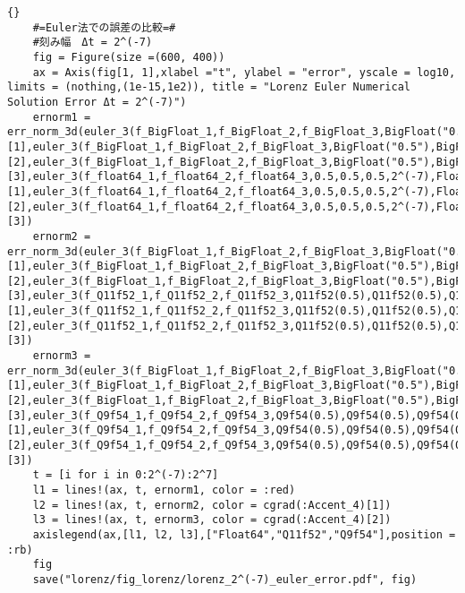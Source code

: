 \begin{lstlisting}[caption=\text{Lorenz\_example},label=code_lorenz]{}
    #=Euler法での誤差の比較=#
    #刻み幅　Δt = 2^(-7)
    fig = Figure(size =(600, 400))
    ax = Axis(fig[1, 1],xlabel ="t", ylabel = "error", yscale = log10, limits = (nothing,(1e-15,1e2)), title = "Lorenz Euler Numerical Solution Error Δt = 2^(-7)")
    ernorm1 = err_norm_3d(euler_3(f_BigFloat_1,f_BigFloat_2,f_BigFloat_3,BigFloat("0.5"),BigFloat("0.5"),BigFloat("0.5"),BigFloat(2^(-7)),BigFloat,Int(2^14))[1],euler_3(f_BigFloat_1,f_BigFloat_2,f_BigFloat_3,BigFloat("0.5"),BigFloat("0.5"),BigFloat("0.5"),BigFloat(2^(-7)),BigFloat,Int(2^14))[2],euler_3(f_BigFloat_1,f_BigFloat_2,f_BigFloat_3,BigFloat("0.5"),BigFloat("0.5"),BigFloat("0.5"),BigFloat(2^(-7)),BigFloat,Int(2^14))[3],euler_3(f_float64_1,f_float64_2,f_float64_3,0.5,0.5,0.5,2^(-7),Float64,Int(2^14))[1],euler_3(f_float64_1,f_float64_2,f_float64_3,0.5,0.5,0.5,2^(-7),Float64,Int(2^14))[2],euler_3(f_float64_1,f_float64_2,f_float64_3,0.5,0.5,0.5,2^(-7),Float64,Int(2^14))[3])
    ernorm2 = err_norm_3d(euler_3(f_BigFloat_1,f_BigFloat_2,f_BigFloat_3,BigFloat("0.5"),BigFloat("0.5"),BigFloat("0.5"),BigFloat(2^(-7)),BigFloat,Int(2^14))[1],euler_3(f_BigFloat_1,f_BigFloat_2,f_BigFloat_3,BigFloat("0.5"),BigFloat("0.5"),BigFloat("0.5"),BigFloat(2^(-7)),BigFloat,Int(2^14))[2],euler_3(f_BigFloat_1,f_BigFloat_2,f_BigFloat_3,BigFloat("0.5"),BigFloat("0.5"),BigFloat("0.5"),BigFloat(2^(-7)),BigFloat,Int(2^14))[3],euler_3(f_Q11f52_1,f_Q11f52_2,f_Q11f52_3,Q11f52(0.5),Q11f52(0.5),Q11f52(0.5),2^(-7),Q11f52,Int(2^14))[1],euler_3(f_Q11f52_1,f_Q11f52_2,f_Q11f52_3,Q11f52(0.5),Q11f52(0.5),Q11f52(0.5),2^(-7),Q11f52,Int(2^14))[2],euler_3(f_Q11f52_1,f_Q11f52_2,f_Q11f52_3,Q11f52(0.5),Q11f52(0.5),Q11f52(0.5),2^(-7),Q11f52,Int(2^14))[3]) 
    ernorm3 = err_norm_3d(euler_3(f_BigFloat_1,f_BigFloat_2,f_BigFloat_3,BigFloat("0.5"),BigFloat("0.5"),BigFloat("0.5"),BigFloat(2^(-7)),BigFloat,Int(2^14))[1],euler_3(f_BigFloat_1,f_BigFloat_2,f_BigFloat_3,BigFloat("0.5"),BigFloat("0.5"),BigFloat("0.5"),BigFloat(2^(-7)),BigFloat,Int(2^14))[2],euler_3(f_BigFloat_1,f_BigFloat_2,f_BigFloat_3,BigFloat("0.5"),BigFloat("0.5"),BigFloat("0.5"),BigFloat(2^(-7)),BigFloat,Int(2^14))[3],euler_3(f_Q9f54_1,f_Q9f54_2,f_Q9f54_3,Q9f54(0.5),Q9f54(0.5),Q9f54(0.5),2^(-7),Q9f54,Int(2^14))[1],euler_3(f_Q9f54_1,f_Q9f54_2,f_Q9f54_3,Q9f54(0.5),Q9f54(0.5),Q9f54(0.5),2^(-7),Q9f54,Int(2^14))[2],euler_3(f_Q9f54_1,f_Q9f54_2,f_Q9f54_3,Q9f54(0.5),Q9f54(0.5),Q9f54(0.5),2^(-7),Q9f54,Int(2^14))[3])
    t = [i for i in 0:2^(-7):2^7]
    l1 = lines!(ax, t, ernorm1, color = :red)
    l2 = lines!(ax, t, ernorm2, color = cgrad(:Accent_4)[1])
    l3 = lines!(ax, t, ernorm3, color = cgrad(:Accent_4)[2])
    axislegend(ax,[l1, l2, l3],["Float64","Q11f52","Q9f54"],position = :rb)
    fig
    save("lorenz/fig_lorenz/lorenz_2^(-7)_euler_error.pdf", fig)


\end{lstlisting}

